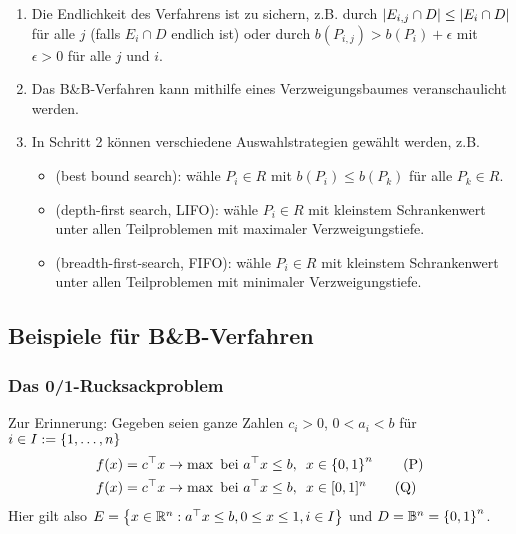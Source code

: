 \begin{*bemerkung}
	\begin{enumerate}
		\item Die Endlichkeit des Verfahrens ist zu sichern, z.B. durch $\left| E_{i,j} \cap D \right| \le \left| E_i \cap D \right|$ für alle $j$ (falls $E_i \cap D$ endlich ist) oder durch $b(P_{i,j}) > b(P_i) + \epsilon$ mit $\epsilon > 0$ für alle $j$ und $i$.
		\item Das B\&B-Verfahren kann mithilfe eines Verzweigungsbaumes veranschaulicht werden.
		\item In Schritt 2 können verschiedene Auswahlstrategien gewählt werden, z.B. 
		\begin{itemize}[noitemsep]
			\item {} (best bound search): wähle $P_i \in R$ mit $b(P_i) \le b(P_k)$ für alle $P_k \in R$.
			\item {} (depth-first search, LIFO): wähle $P_i \in R$ mit kleinstem Schrankenwert unter allen Teilproblemen mit maximaler Verzweigungstiefe.
			\item {} (breadth-first-search, FIFO): wähle $P_i \in R$ mit kleinstem Schrankenwert unter allen Teilproblemen mit minimaler Verzweigungstiefe.
		\end{itemize}
	\end{enumerate}
\end{*bemerkung}

\subsection{Beispiele für B\&B-Verfahren}

\subsubsection{Das 0/1-Rucksackproblem}

Zur Erinnerung: Gegeben seien ganze Zahlen $c_i > 0$, $0 < a_i < b$ für $i \in I \mathrel{:=} \left\{ 1, \dots, n \right\}$
\begin{align*}
	f(x) &= c^{\top} x \to \max \text{ bei } a^{\top} x \le b, \enskip x \in \left\{ 0,1 \right\}^n 
	\tag{P} \\
	f(x) &= c^{\top} x \to \max \text{ bei } a^{\top} x \le b, \enskip x \in [0,1]^n 
	\tag{Q} \label{eq: rucksack-q}
\end{align*}
Hier gilt also $E = \left\{ x \in \mathbb{R}^n : a^{\top} x \le b, 0 \le x \le 1, i \in I \right\}$ und $D = \mathbb{B}^n = \left\{ 0,1 \right\}^n$.

